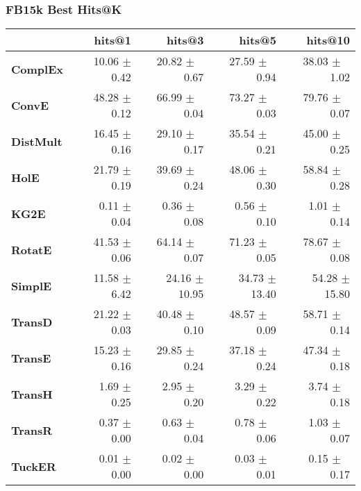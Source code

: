 \documentclass{article}
\begin{document}
\subsubsection{FB15k Best Hits@K}
    \begin{center}
    \begin{tabular}{lrrrr}
\toprule
{} &        hits@1 &         hits@3 &         hits@5 &        hits@10 \\
\midrule
\textbf{ComplEx } &  10.06 $\pm$ 0.42 &  20.82 $\pm$ $\phantom{5}$0.67 &  27.59 $\pm$ $\phantom{5}$0.94 &  38.03 $\pm$ $\phantom{5}$1.02 \\
\textbf{ConvE   } &  48.28 $\pm$ 0.12 &  66.99 $\pm$ $\phantom{5}$0.04 &  73.27 $\pm$ $\phantom{5}$0.03 &  79.76 $\pm$ $\phantom{5}$0.07 \\
\textbf{DistMult} &  16.45 $\pm$ 0.16 &  29.10 $\pm$ $\phantom{5}$0.17 &  35.54 $\pm$ $\phantom{5}$0.21 &  45.00 $\pm$ $\phantom{5}$0.25 \\
\textbf{HolE    } &  21.79 $\pm$ 0.19 &  39.69 $\pm$ $\phantom{5}$0.24 &  48.06 $\pm$ $\phantom{5}$0.30 &  58.84 $\pm$ $\phantom{5}$0.28 \\
\textbf{KG2E    } &  $\phantom{5}$0.11 $\pm$ 0.04 &  $\phantom{5}$0.36 $\pm$ $\phantom{5}$0.08 &  $\phantom{5}$0.56 $\pm$ $\phantom{5}$0.10 &  $\phantom{5}$1.01 $\pm$ $\phantom{5}$0.14 \\
\textbf{RotatE  } &  41.53 $\pm$ 0.06 &  64.14 $\pm$ $\phantom{5}$0.07 &  71.23 $\pm$ $\phantom{5}$0.05 &  78.67 $\pm$ $\phantom{5}$0.08 \\
\textbf{SimplE  } &  11.58 $\pm$ 6.42 &  24.16 $\pm$ 10.95 &  34.73 $\pm$ 13.40 &  54.28 $\pm$ 15.80 \\
\textbf{TransD  } &  21.22 $\pm$ 0.03 &  40.48 $\pm$ $\phantom{5}$0.10 &  48.57 $\pm$ $\phantom{5}$0.09 &  58.71 $\pm$ $\phantom{5}$0.14 \\
\textbf{TransE  } &  15.23 $\pm$ 0.16 &  29.85 $\pm$ $\phantom{5}$0.24 &  37.18 $\pm$ $\phantom{5}$0.24 &  47.34 $\pm$ $\phantom{5}$0.18 \\
\textbf{TransH  } &  $\phantom{5}$1.69 $\pm$ 0.25 &  $\phantom{5}$2.95 $\pm$ $\phantom{5}$0.20 &  $\phantom{5}$3.29 $\pm$ $\phantom{5}$0.22 &  $\phantom{5}$3.74 $\pm$ $\phantom{5}$0.18 \\
\textbf{TransR  } &  $\phantom{5}$0.37 $\pm$ 0.00 &  $\phantom{5}$0.63 $\pm$ $\phantom{5}$0.04 &  $\phantom{5}$0.78 $\pm$ $\phantom{5}$0.06 &  $\phantom{5}$1.03 $\pm$ $\phantom{5}$0.07 \\
\textbf{TuckER  } &  $\phantom{5}$0.01 $\pm$ 0.00 &  $\phantom{5}$0.02 $\pm$ $\phantom{5}$0.00 &  $\phantom{5}$0.03 $\pm$ $\phantom{5}$0.01 &  $\phantom{5}$0.15 $\pm$ $\phantom{5}$0.17 \\
\bottomrule
\end{tabular}

    \end{center}
\end{document}
